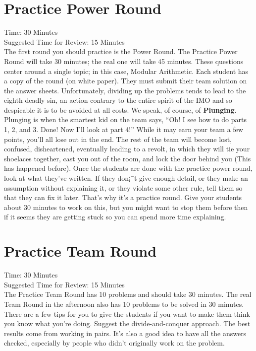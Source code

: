 \documentclass[11pt]{article}
\begin{document}
\begin{small}
\section{Practice Power Round}
\noindent Time: 30 Minutes \\
\noindent Suggested Time for Review: 15 Minutes\\
\noindent The first round you should practice is the Power Round. The Practice Power Round will take 30 minutes; the real one will take 45 minutes. These questions center around a single topic; in this case, Modular Arithmetic.  Each student has a copy of the round (on white paper).  They must submit their team solution on the answer sheets. Unfortunately, dividing up the problems tends to lead to the eighth deadly sin, an action contrary to the entire spirit of the IMO and so despicable it is to be avoided at all costs. We speak, of course, of \textbf{Plunging}. Plunging is when the smartest kid on the team says, ``Oh! I see how to do parts 1, 2, and 3. Done! Now I'll look at part 4!'' While it may earn your team a few points, you'll all lose out in the end. The rest of the team will become lost, confused, disheartened, eventually leading to a revolt, in which they will tie your shoelaces together, cast you out of the room, and lock the door behind you (This has happened before). Once the students are done with the practice power round, look at what they've written. If they don¡¯t give enough detail, or they make an assumption without explaining it, or they violate some other rule, tell them so that they can fix it later. That's why it's a practice round. Give your students about 30 minutes to work on this, but you might want to stop them before then if it seems they are getting stuck so you can spend more time explaining.

\section{Practice Team Round}
\noindent Time: 30 Minutes \\
\noindent Suggested Time for Review: 15 Minutes\\
\noindent The Practice Team Round has 10 problems and should take 30 minutes. The real Team Round in the afternoon also has 10 problems to be solved in 30 minutes.  There are a few tips for you to give the students if you want to make them think you know what you're doing. Suggest the divide-and-conquer approach. The best results come from working in pairs. It's also a good idea to have all the answers checked, especially by people who didn't originally work on the problem.


\end{small}
\end{document}
